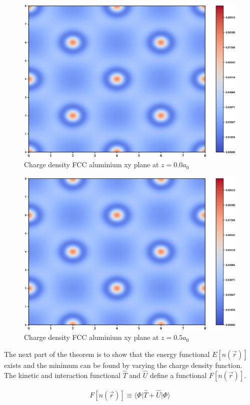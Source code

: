 \FloatBarrier
\begin{figure}[!htb]
\includegraphics[width=0.8\linewidth]{chapters/interatomic_potential_fitting/images/layer0000.eps}
\caption{Charge density FCC aluminium xy plane at $z=0.0 a_0$}
\label{fig:cdalfcc1}
\end{figure}

\begin{figure}[!htb]
\includegraphics[width=0.8\linewidth]{chapters/interatomic_potential_fitting/images/layer0050.eps}
\caption{Charge density FCC aluminium xy plane at $z=0.5 a_0$}
\label{fig:cdalfcc2}
\end{figure}


The next part of the theorem is to show that the energy functional $E[n(\vec{r})]$ exists and the minimum can be found by varying the charge density function.  The kinetic and interaction functional $\hat{T}$ and $\hat{U}$ define a functional $F[n(\vec{r})]$.

\begin{equation}
\begin{split}
F[n(\vec{r})] \equiv \langle \Phi \lvert \hat{T} + \hat{U} \rvert \Phi \rangle 
\end{split}
\label{eq:hkffunctional}
\end{equation}

